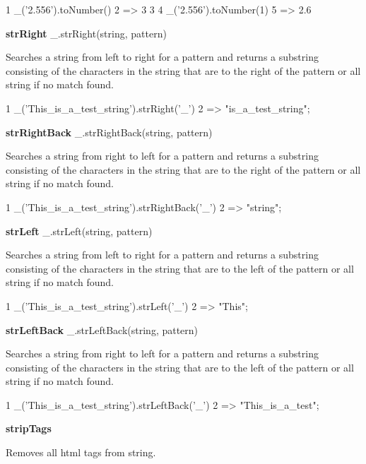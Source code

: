\begin{DoxyCode}
1 \_('2.556').toNumber()
2 => 3
3 
4 \_('2.556').toNumber(1)
5 => 2.6
\end{DoxyCode}


{\bfseries str\+Right} \+\_\+.\+str\+Right(string, pattern)

Searches a string from left to right for a pattern and returns a substring consisting of the characters in the string that are to the right of the pattern or all string if no match found.


\begin{DoxyCode}
1 \_('This\_is\_a\_test\_string').strRight('\_')
2 => "is\_a\_test\_string";
\end{DoxyCode}


{\bfseries str\+Right\+Back} \+\_\+.\+str\+Right\+Back(string, pattern)

Searches a string from right to left for a pattern and returns a substring consisting of the characters in the string that are to the right of the pattern or all string if no match found.


\begin{DoxyCode}
1 \_('This\_is\_a\_test\_string').strRightBack('\_')
2 => "string";
\end{DoxyCode}


{\bfseries str\+Left} \+\_\+.\+str\+Left(string, pattern)

Searches a string from left to right for a pattern and returns a substring consisting of the characters in the string that are to the left of the pattern or all string if no match found.


\begin{DoxyCode}
1 \_('This\_is\_a\_test\_string').strLeft('\_')
2 => "This";
\end{DoxyCode}


{\bfseries str\+Left\+Back} \+\_\+.\+str\+Left\+Back(string, pattern)

Searches a string from right to left for a pattern and returns a substring consisting of the characters in the string that are to the left of the pattern or all string if no match found.


\begin{DoxyCode}
1 \_('This\_is\_a\_test\_string').strLeftBack('\_')
2 => "This\_is\_a\_test";
\end{DoxyCode}


{\bfseries strip\+Tags}

Removes all html tags from string.



